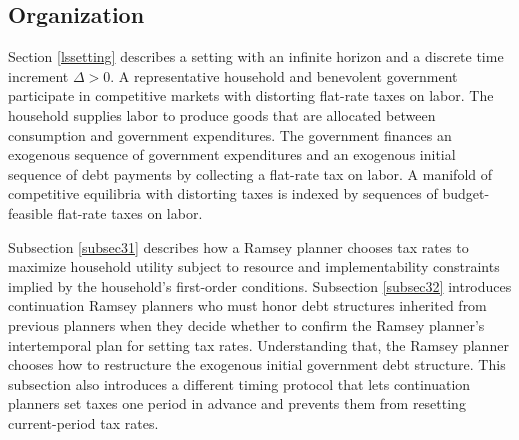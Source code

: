 \documentclass[12pt]{article}
\newcommand{\NW}[1]{{\textcolor{blue}{#1}}}
\newcommand{\WJ}[1]{{\textcolor{red}{#1}}}
\newcommand{\TS}[1]{{\textcolor{magenta}{#1}}}
\begin{document}
\subsection*{Organization}


Section \ref{lssetting}  describes a setting with   an infinite horizon and a discrete  time increment $\Delta >0$. A representative household and benevolent government   participate in competitive markets with distorting flat-rate taxes on labor. The household supplies labor to produce goods that are  allocated between consumption and government expenditures. The government finances an exogenous sequence of government expenditures and an exogenous  initial sequence of debt payments by collecting a flat-rate tax on labor.  A manifold of competitive equilibria with  distorting taxes is indexed by sequences of budget-feasible flat-rate taxes on labor.

{%
Subsection \ref{subsec31}
 describes how a Ramsey planner chooses tax rates to maximize household utility subject to resource and implementability constraints implied by the household's first-order conditions.     Subsection \ref{subsec32} introduces continuation Ramsey planners who must honor debt structures inherited from previous planners when they decide whether to confirm  the Ramsey planner's intertemporal plan for setting  tax rates. Understanding that, the Ramsey planner chooses how to  restructure the exogenous initial government debt structure. This subsection also  introduces a different timing protocol that 
 lets continuation planners set taxes one period in advance and prevents them  from resetting current-period tax rates.} %
%
\end{document}

